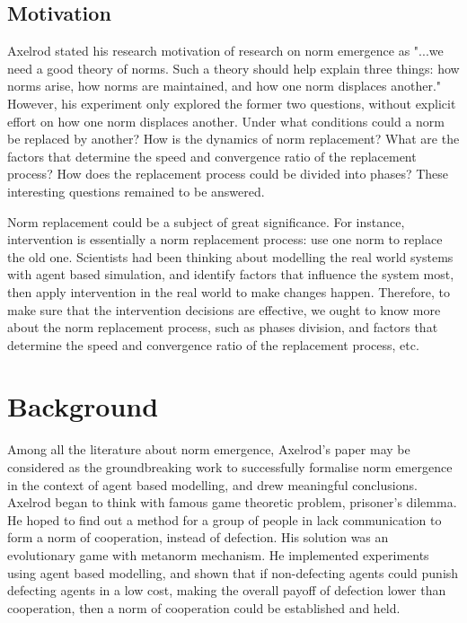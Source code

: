 \documentclass[12pt]{extarticle}
\begin{document}
\subsection{Motivation}
Axelrod stated his research motivation of research on norm emergence as "...we need a good theory of norms. Such a theory should help explain three things: how norms arise, how norms are maintained, and how one norm displaces another."\cite{axelrod1986evolutionary} However, his  experiment only explored the former two questions, without explicit effort on how one norm displaces another. Under what conditions could a norm be replaced by another? How is the dynamics of norm replacement? What are the factors that determine the speed and convergence ratio of the replacement process? How does the replacement process could be divided into phases? These interesting questions remained to be answered.

Norm replacement could be a subject of great significance. For instance, intervention is essentially a norm replacement process: use one norm to replace the old one. Scientists had been thinking about modelling the real world systems with agent based simulation, and identify factors that influence the system most, then apply intervention in the real world to make changes happen. Therefore, to make sure that the intervention decisions are effective, we ought to know more about the norm replacement process, such as phases division, and factors that determine the speed and convergence ratio of the replacement process, etc.

\section{Background}
Among all the literature about norm emergence, Axelrod's paper\cite{axelrod1986evolutionary} may be considered as the groundbreaking work to successfully formalise norm emergence in the context of agent based modelling, and drew meaningful conclusions. Axelrod began to think with famous game theoretic problem, prisoner's dilemma. He hoped to find out a method for a group of people in lack communication to form a norm of cooperation, instead of defection. His solution was an evolutionary game with metanorm mechanism. He implemented experiments using agent based modelling, and shown that if non-defecting agents could punish defecting agents in a low cost, making the overall payoff of defection lower than cooperation, then a norm of cooperation could be established and held.
\end{document}

